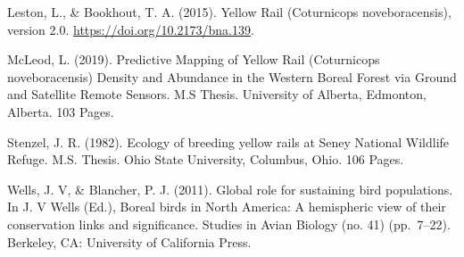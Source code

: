 \documentclass[11pt,]{article}
\begin{document}
Leston, L., \& Bookhout, T. A. (2015). Yellow Rail (Coturnicops
noveboracensis), version 2.0. \url{https://doi.org/10.2173/bna.139}.

McLeod, L. (2019). Predictive Mapping of Yellow Rail (Coturnicops
noveboracensis) Density and Abundance in the Western Boreal Forest via
Ground and Satellite Remote Sensors. M.S Thesis. University of Alberta,
Edmonton, Alberta. 103 Pages.

Stenzel, J. R. (1982). Ecology of breeding yellow rails at Seney
National Wildlife Refuge. M.S. Thesis. Ohio State University, Columbus,
Ohio. 106 Pages.

Wells, J. V, \& Blancher, P. J. (2011). Global role for sustaining bird
populations. In J. V Wells (Ed.), Boreal birds in North America: A
hemispheric view of their conservation links and significance. Studies
in Avian Biology (no. 41) (pp.~7--22). Berkeley, CA: University of
California Press.
\end{document}
